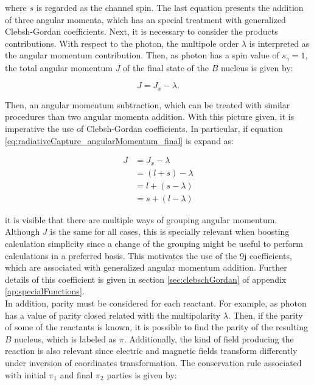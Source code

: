 \documentclass[openany]{book}
\begin{document}
where $s$ is regarded as the channel spin. The last equation presents the addition of three angular momenta, which has an special treatment with generalized Clebsh-Gordan coefficients. Next, it is necessary to consider the products contributions. With respect to the photon, the multipole order $\lambda$ is interpreted as the angular momentum contribution. Then, as photon has a spin value of $s_\gamma = 1$, the total angular momentum $J$ of the final state of the $B$ nucleus is given by: 

\begin{equation}  \label{eq:radiativeCapture_angularMomentum_final}
	J = J_x - \lambda.
\end{equation}

Then, an angular momentum subtraction, which can be treated with similar procedures than two angular momenta addition.  With this picture given, it is imperative the use of Clebsh-Gordan coefficients. In particular, if equation \ref{eq:radiativeCapture_angularMomentum_final} is expand as: 

\begin{equation}  \label{eq:radiativeCapture_angularMomentum_expanded}
	\begin{split}
		J  &= J_x - \lambda \\
			&= (l + s) - \lambda \\
			&= l + (s - \lambda) \\
			&= s + (l - \lambda)
	\end{split}
\end{equation}

it is visible that there are multiple ways of grouping angular momentum. Although $J$ is the same for all cases,  this is specially relevant when boosting calculation simplicity since a change of the grouping might be useful to perform calculations in a preferred basis. This motivates the use of the 9j coefficients, which are associated with generalized angular momentum addition. Further details of this coefficient is given in section \ref{sec:clebschGordan} of appendix \ref{ap:specialFunctions}. \\

In addition, parity must be considered for each reactant. For example, as photon has a value of parity closed related with the multipolarity $\lambda$. Then, if the parity of some of the reactants is known, it is possible to find the parity of the resulting $B$ nucleus, which is labeled as $\pi$.  Additionally, the kind of field producing the reaction is also relevant since electric and magnetic fields transform differently under inversion of coordinates transformation. The conservation rule associated with initial $\pi_1$ and final $\pi_2$ parties is given by:  
\end{document}
